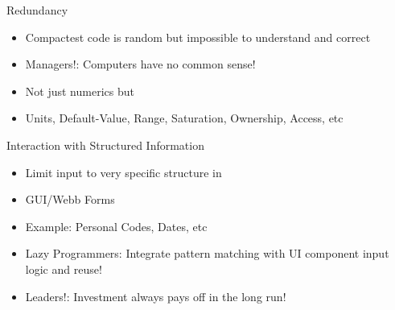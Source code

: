 \documentclass[xcolor=dvipsnames]{beamer}
\begin{document}
\begin{frame}[fragile]{Redundancy}
  \begin{figure}
  \end{figure}
  \begin{itemize}[<+->]
  \item Compactest code is random but impossible to understand and correct
  \item Managers!: Computers have no common sense!
  \item Not just numerics but
  \item Units, Default-Value, Range, Saturation, Ownership, Access, etc
  \end{itemize}
\end{frame}

\begin{frame}[fragile]{Interaction with Structured Information}
  \begin{itemize}[<+->]
  \item Limit input to very specific structure in
  \item GUI/Webb Forms
  \item Example: Personal Codes, Dates, etc
  \item Lazy Programmers: Integrate pattern matching with UI component input
    logic and reuse!
  \item Leaders!: Investment always pays off in the long run!
  \end{itemize}
\end{frame}
\end{document}
